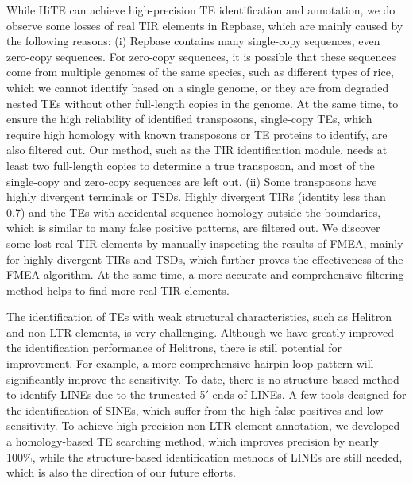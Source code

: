 \documentclass{bmcart}
\begin{document}
While HiTE can achieve high-precision TE identification and annotation, we do observe some losses of real TIR elements in Repbase, which are mainly caused by the following reasons:
(i) Repbase contains many single-copy sequences, even zero-copy sequences. For zero-copy sequences, it is possible that these sequences come from multiple genomes of the same species, such as different types of rice, which we cannot identify based on a single genome, or they are from degraded nested TEs without other full-length copies in the genome. At the same time, to ensure the high reliability of identified transposons, single-copy TEs, which require high homology with known transposons or TE proteins to identify, are also filtered out. Our method, such as the TIR identification module, needs at least two full-length copies to determine a true transposon, and most of the single-copy and zero-copy sequences are left out.
(ii) Some transposons have highly divergent terminals or TSDs. Highly divergent TIRs (identity less than 0.7) and the TEs with accidental sequence homology outside the boundaries, which is similar to many false positive patterns, are filtered out. We discover some lost real TIR elements by manually inspecting the results of FMEA, mainly for highly divergent TIRs and TSDs, which further proves the effectiveness of the FMEA algorithm. At the same time, a more accurate and comprehensive filtering method helps to find more real TIR elements.

The identification of TEs with weak structural characteristics, such as Helitron and non-LTR elements, is very challenging. Although we have greatly improved the identification performance of Helitrons, there is still potential for improvement. For example, a more comprehensive hairpin loop pattern will significantly improve the sensitivity. To date, there is no structure-based method to identify LINEs due to the truncated 5$'$ ends of LINEs. A few tools designed for the identification of SINEs, which suffer from the high false positives and low sensitivity. To achieve high-precision non-LTR element annotation, we developed a homology-based TE searching method, which improves precision by nearly 100\%, while the structure-based identification methods of LINEs are still needed, which is also the direction of our future efforts.
\end{document}

